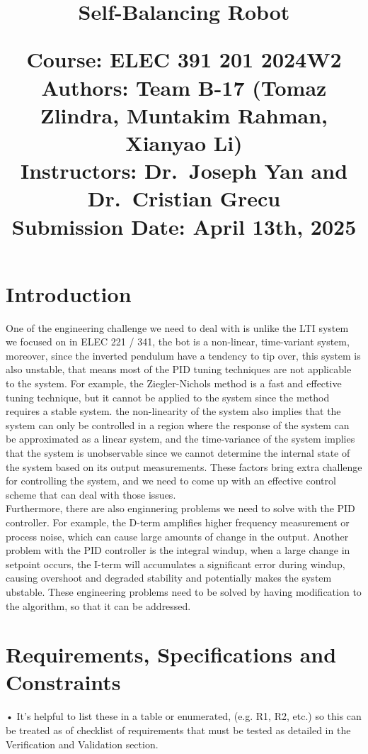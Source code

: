 \documentclass{article}
\title{
    \Huge \textbf{Self-Balancing Robot}

    \vspace{100pt}

    \large Course: ELEC 391 201 2024W2 \\[1em]
    \large Authors: Team B-17 (Tomaz Zlindra, Muntakim Rahman, Xianyao Li) \\[1em]
    \large Instructors: Dr.\ Joseph Yan and Dr.\ Cristian Grecu \\[1em]
    \large Submission Date: April 13th, 2025 \\
}
\date{} %
\begin{document}
\maketitle
\newpage %

\tableofcontents %

\newpage %

\section{Introduction}

One of the engineering challenge we need to deal with is unlike the LTI system
we focused on in ELEC 221 / 341, the bot is a non-linear, time-variant system,
moreover, since the inverted pendulum have a tendency to tip over, this system
is also unstable, that means most of the PID tuning techniques are not
applicable to the system. For example, the Ziegler-Nichols method is a fast and
effective tuning technique, but it cannot be applied to the system since the
method requires a stable system. the non-linearity of the system also implies 
that the system can only be controlled in a region where the response of the
system can be approximated as a linear system, and the time-variance of the
system implies that the system is unobservable since we cannot determine the 
internal state of the system based on its output measurements. These factors
bring extra challenge for controlling the system, and we need to come up with
an effective control scheme that can deal with those issues.\\

Furthermore, there are also enginnering problems we need to solve with the PID 
controller. For example, the D-term amplifies higher frequency measurement or
process noise, which can cause large amounts of change in the output. Another
problem with the PID controller is the integral windup, when a large change in
setpoint occurs, the I-term will accumulates a significant error during windup,
causing overshoot and degraded stability and potentially makes the system 
ubstable. These engineering problems need to be solved by having modification to
the algorithm, so that it can be addressed.

\section{Requirements, Specifications and Constraints}
• It's helpful to list these in a table or enumerated, (e.g. R1, R2, etc.) so this can be treated as of checklist of
requirements that must be tested as detailed in the Verification and Validation section.
\end{document}
